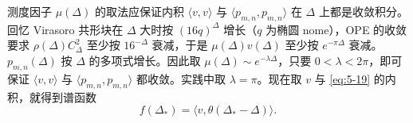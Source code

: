 
测度因子 $\mu(\Delta)$ 的取法应保证内积 $\langle v,v\rangle$ 与 $\langle p_{m,n},p_{m,n}\rangle$ 在 $\Delta$ 上都是收敛积分。回忆 Virasoro 共形块在 $\Delta$ 大时按 $(16q)^\Delta$ 增长（$q$ 为椭圆 nome），OPE 的收敛要求 $\rho(\Delta)C_\Delta^2$ 至少按 $16^{-\Delta}$ 衰减，于是 $\mu(\Delta)v(\Delta)$ 至少按 $e^{-\pi\Delta}$ 衰减。$p_{m,n}(\Delta)$ 按 $\Delta$ 的多项式增长。因此取 $\mu(\Delta)\sim e^{-\lambda\Delta}$，只要 $0<\lambda<2\pi$，即可保证 $\langle v,v\rangle$ 与 $\langle p_{m,n},p_{m,n}\rangle$ 都收敛。实践中取 $\lambda=\pi$。现在取 $v$ 与 \eqref{eq:5-19} 的内积，就得到谱函数
\begin{equation}
  \label{eq:5-22}
  f(\Delta_*)=\langle v,\theta(\Delta_*-\Delta)\rangle .
\end{equation}


